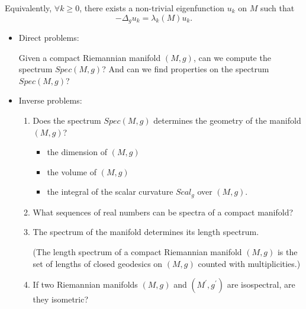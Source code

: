 Equivalently, $\forall k \geq 0$, there exists a non-trivial eigenfunction $u_k$ on $M$  such that 
$$-\Delta_g u_k = \lambda_k(M) u_k.$$

\begin{itemize}
    \item Direct problems: 
    
    Given a compact Riemannian manifold $(M,g)$, can we compute the spectrum $Spec(M,g)$? And can we find properties on the spectrum $Spec(M,g)$?
    \item Inverse problems: 
    \begin{enumerate}
        \item Does the spectrum $Spec(M,g)$ determines the geometry of the manifold $(M,g)$? 
        \begin{itemize}
            \item the dimension of $(M,g)$
            \item the volume of $(M,g)$
            \item the integral of the scalar curvature $Scal_g$ over $(M,g)$.
        \end{itemize}
        
        \item What sequences of real numbers can be spectra of a compact manifold?
        
        \item The spectrum of the manifold determines its length spectrum. 
        
        (The length spectrum of a compact Riemannian manifold $(M,g)$ is the set of lengths of closed geodesics on $(M,g)$ counted with multiplicities.)
        
        \item If two Riemannian manifolds $(M,g)$ and $(M^\prime,g^\prime)$ are isospectral, are they isometric?
    \end{enumerate}
    \end{itemize}
    
